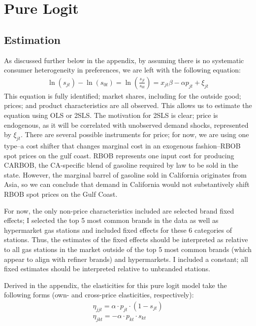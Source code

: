 \documentclass{article}
\begin{document}
\section{Pure Logit}

\subsection{Estimation}
As discussed further below in the appendix, by assuming there is no systematic consumer heterogeneity in preferences, we are left with the following equation:
\begin{gather}
	\ln(s_{jt}) - \ln(s_{0t}) = \ln(\frac{s_{jt}}{s_{0t}}) = x_{jt} \beta - \alpha p_{jt} + \xi_{jt}
\end{gather}
This equation is fully identified; market shares, including for the outside good; prices; and product characteristics are all observed. This allows us to estimate the equation using OLS or 2SLS. The motivation for 2SLS is clear; price is endogenous, as it will be correlated with unobserved demand shocks, represented by $\xi_{jt}$. There are several possible instruments for price; for now, we are using one type--a cost shifter that changes marginal cost in an exogenous fashion--RBOB spot prices on the gulf coast. RBOB represents one input cost for producing CARBOB, the CA-specific blend of gasoline required by law to be sold in the state. However, the marginal barrel of gasoline sold in California originates from Asia, so we can conclude that demand in California would not substantively shift RBOB spot prices on the Gulf Coast.

For now, the only non-price characteristics included are selected brand fixed effects; I selected the top 5 most common brands in the data as well as hypermarket gas stations and included fixed effects for these 6 categories of stations. Thus, the estimates of the fixed effects should be interpreted as relative to all gas stations in the market outside of the top 5 most common brands (which appear to align with refiner brands) and hypermarkets. I included a constant; all fixed estimates should be interpreted relative to unbranded stations.
 
Derived in the appendix, the elasticities for this pure logit model take the following forms (own- and cross-price elasticities, respectively):
\begin{gather}
	\eta_{jjt} =  \alpha \cdot p_{jt} \cdot (1 - s_{jt}) \\
	\eta_{jkt} = -\alpha \cdot p_{kt} \cdot s_{kt}
\end{gather}
\end{document}

